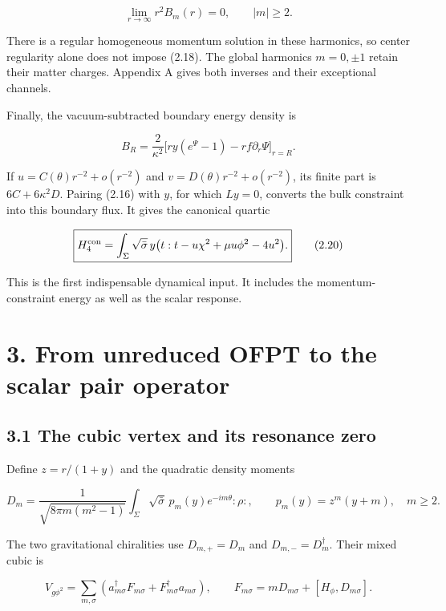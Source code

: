 \documentclass[a4paper,11pt]{article}
\numberwithin{equation}{section}
\begin{document}
\[
\lim_{r\to\infty}r^2B_m(r)=0,\qquad |m|\ge2 .
\tag{2.18}
\]

There is a regular homogeneous momentum solution in these harmonics, so center regularity alone does not impose (2.18). The global harmonics \(m=0,\pm1\) retain their matter charges. Appendix A gives both inverses and their exceptional channels.

Finally, the vacuum-subtracted boundary energy density is

\[
B_R=\frac2{\kappa^2}
\bigl[ry(e^\Psi-1)-rf\partial_r\Psi\bigr]_{r=R}.
\tag{2.19}
\]

If \(u=C(\theta)r^{-2}+o(r^{-2})\) and \(v=D(\theta)r^{-2}+o(r^{-2})\), its finite part is \(6C+6\kappa^2D\). Pairing (2.16) with \(y\), for which \(Ly=0\), converts the bulk constraint into this boundary flux. It gives the canonical quartic

\[
\boxed{
H_4^{\rm con}
=\int_\Sigma\sqrt{\bar\sigma}\,y
\bigl(t:t-u\chi^2+\mu u\phi^2-4u^2\bigr).
}
\tag{2.20}
\]

This is the first indispensable dynamical input. It includes the momentum-constraint energy as well as the scalar response.

\clearpage
\hypertarget{from-unreduced-ofpt-to-the-scalar-pair-operator}{%
\section{3. From unreduced OFPT to the scalar pair operator}\label{from-unreduced-ofpt-to-the-scalar-pair-operator}}

\hypertarget{the-cubic-vertex-and-its-resonance-zero}{%
\subsection{3.1 The cubic vertex and its resonance zero}\label{the-cubic-vertex-and-its-resonance-zero}}

Define \(z=r/(1+y)\) and the quadratic density moments

\[
D_m=\frac1{\sqrt{8\pi m(m^2-1)}}
\int_\Sigma\sqrt{\bar\sigma}\,
p_m(y)e^{-im\theta}:\rho:,
\qquad p_m(y)=z^m(y+m),\quad m\ge2.
\tag{3.1}
\]

The two gravitational chiralities use \(D_{m,+}=D_m\) and \(D_{m,-}=D_m^\dagger\). Their mixed cubic is

\[
V_{g\phi^2}
=\sum_{m,\sigma}(a^\dagger_{m\sigma}F_{m\sigma}
+F^\dagger_{m\sigma}a_{m\sigma}),\qquad
F_{m\sigma}=mD_{m\sigma}+[H_\phi,D_{m\sigma}].
\tag{3.2}
\]
\end{document}
